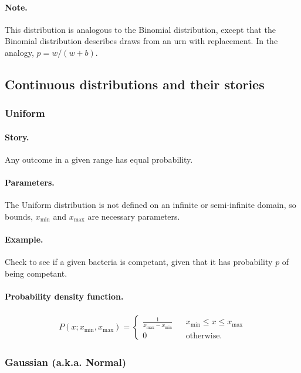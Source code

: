\paragraph{Note.} This distribution is analogous to the Binomial
distribution, except that the Binomial distribution describes draws
from an urn with replacement.  In the analogy, $p = w/(w+b)$.


\subsection{Continuous distributions and their stories}

\subsubsection{Uniform}
\paragraph{Story.} Any outcome in a given range has equal probability.
\paragraph{Parameters.} The Uniform distribution is not defined on an
infinite or semi-infinite domain, so bounds, $x_\mathrm{min}$ and
$x_\mathrm{max}$ are necessary parameters.
\paragraph{Example.} Check to see if a given bacteria is competant,
given that it has probability $p$ of being competant.
\paragraph{Probability density function.}
\begin{align}
P(x;x_\mathrm{min}, x_\mathrm{max}) = \left\{ \begin{array}{ccc}
\frac{1}{x_\mathrm{max} - x_\mathrm{min}} & & x_\mathrm{min} \le x \le x_\mathrm{max} \\[0.5em]
0 & & \text{otherwise.}
\end{array}
\right.
\end{align}



\subsubsection{Gaussian  (a.k.a. Normal)}
